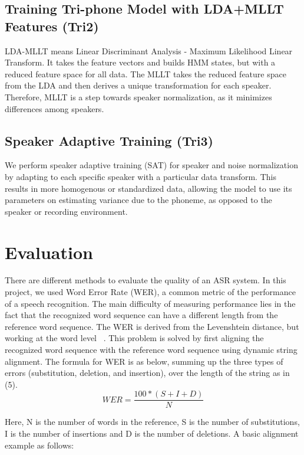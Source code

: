 \documentclass[conference]{IEEEtran}
\begin{document}
\subsection{Training Tri-phone Model with LDA+MLLT Features (Tri2)}
\label{sec:TrainingTri-phoneModelwithLDA+MLLTFeatures}
LDA-MLLT means Linear Discriminant Analysis - Maximum Likelihood Linear Transform. It takes the feature vectors and builds HMM states, but with a reduced feature space for all data. The MLLT takes the reduced feature space from the LDA and then derives a unique transformation for each speaker. Therefore, MLLT is a step towards speaker normalization, as it minimizes differences among speakers.

\subsection{Speaker Adaptive Training (Tri3)}
\label{sec:SpeakerAdaptiveTraining}
We perform speaker adaptive training (SAT) for speaker and noise normalization by adapting to each specific speaker with a particular data transform. This results in more homogenous or standardized data, allowing the model to use its parameters on estimating variance due to the phoneme, as opposed to the speaker or recording environment.

\section{Evaluation}
\label{sec:Evaluation}
There are different methods to evaluate the quality of an ASR system. In this project, we used Word Error Rate (WER), a common metric of the performance of a speech recognition. The main difficulty of measuring performance lies in the fact that the recognized word sequence can have a different length from the reference word sequence. The WER is derived from the Levenshtein distance, but working at the word level ~\cite{wer}. This problem is solved by first aligning the recognized word sequence with the reference word sequence using dynamic string alignment. The formula for WER is as below, summing up the three types of errors (substitution, deletion, and insertion), over the length of the string as in (5).
\begin{equation}\tag{5}
 WER = 
  \frac{100*(S+I+D)}{N}
\end{equation}

Here, N is the number of words in the reference, S is the number of substitutions, I is the number of insertions and D is the number of deletions. A basic alignment example as follows:
\end{document}
